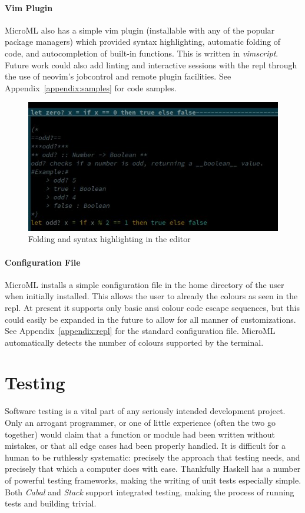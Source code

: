 \documentclass[12pt, a4paper]{report}
\begin{document}
\subsubsection{Vim Plugin}
MicroML also has a simple vim plugin (installable with any of the popular package managers) which
provided syntax highlighting, automatic folding of code, and autocompletion of built-in functions.
This is written in \textit{vimscript}. Future work could also add linting and interactive sessions
with the repl through the use of neovim's jobcontrol and remote plugin facilities. See
Appendix~\ref{appendix:samples} for code samples.

\begin{figure}[H]
    \includegraphics[width=\textwidth]{images/vim.jpg}
    {\caption{Folding and syntax highlighting in the editor}}
\label{fig:foldVim}
\end{figure}

\subsubsection{Configuration File}
MicroML installs a simple configuration file in the home directory of the user when initially
installed. This allows the user to already the colours as seen in the repl. At present it supports
only basic ansi colour code escape sequences, but this could easily be expanded in the future to
allow for all manner of customizations. See Appendix~\ref{appendix:repl} for the standard
configuration file. MicroML automatically detects the number of colours supported by the terminal.

\chapter{Testing}
\label{testing}
Software testing is a vital part of any seriously intended development project. Only an arrogant
programmer, or one of little experience (often the two go together) would claim that a function or
module had been written without mistakes, or that all edge cases had been properly handled. It is
difficult for a human to be ruthlessly systematic: precisely the approach that testing needs, and
precisely that which a computer does with ease. Thankfully Haskell has a number of powerful testing
frameworks, making the writing of unit tests especially simple. Both \textit{Cabal} and
\textit{Stack} support integrated testing, making the process of running tests and building trivial.
\end{document}
